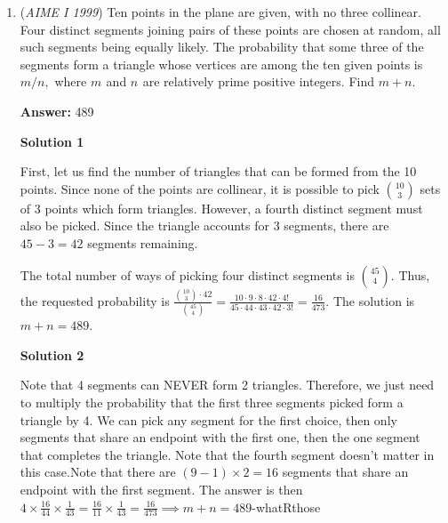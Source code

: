 \begin{enumerate}
 Since we know that $Q=(ac-bd,ad+bc)$, thus we plug in $Q$ into the line: $ad+bc=-\frac{ac^2-bcd}{d}+\frac{c^2}{2d}+\frac{d}{2}$.

 Let's start canceling. $2ad^2+2bcd=-2ac^2+2bcd+c^2+d^2$. Subtracting, $c^2+d^2-2ac^2=2ad^2$. Thus $c^2+d^2=2ac^2+2ad^2$. Since this is an identity for any $(c,d)$, thus $2a=1$. $a=\frac{1}{2}$. Since $|a+bi|=8$, thus $a^2+b^2=64$ (or simply think of $a+bi$ as the point $(a,b)$, and $|a+bi|$ being the distance of $(a,b)$ to the origin). Thus plug in $a=\frac{1}{2}, b^2=\frac{255}{4}$. Since $255$ and $4$ are relatively prime, the final result is $255+4=\boxed{259}$.

 


	\item (\textit{AIME I 1999}) Ten points in the plane are given, with no three collinear.  Four distinct segments joining pairs of these points are chosen at random, all such segments being equally likely.  The probability that some three of the segments form a triangle whose vertices are among the ten given points is $m/n,$ where $m_{}$ and $n_{}$ are relatively prime positive integers.  Find $m+n.$

 \textbf{Answer: }489



\textbf{Solution 1}

First, let us find the number of triangles that can be formed from the 10 points. Since none of the points are collinear, it is possible to pick ${10\choose3}$ sets of 3 points which form triangles. However, a fourth distinct segment must also be picked. Since the triangle accounts for 3 segments, there are $45 - 3 = 42$ segments remaining.

 The total number of ways of picking four distinct segments is ${45\choose4}$. Thus, the requested probability is $\frac{{10\choose3} \cdot 42}{{45\choose4}} = \frac{10 \cdot 9 \cdot 8 \cdot 42 \cdot 4!}{45 \cdot 44 \cdot 43 \cdot 42 \cdot 3!} = \frac{16}{473}$. The solution is $m + n = 489$.

 



\textbf{Solution 2}

Note that 4 segments can NEVER form 2 triangles. Therefore, we just need to multiply the probability that the first three segments picked form a triangle by 4. We can pick any segment for the first choice, then only segments that share an endpoint with the first one, then the one segment that completes the triangle. Note that the fourth segment doesn't matter in this case.Note that there are $(9 - 1) \times 2 = 16$ segments that share an endpoint with the first segment. The answer is then $4 \times \frac{16}{44} \times \frac{1}{43} = \frac{16}{11} \times \frac{1}{43} = \frac{16}{473} \implies m + n = \boxed{489}$-whatRthose


\end{enumerate}

